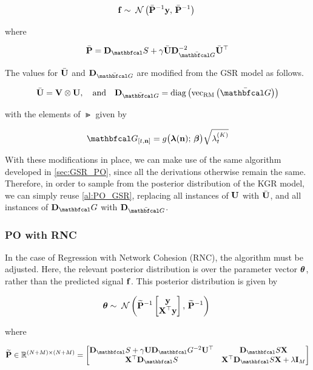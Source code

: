 \begin{equation}
    \mathbf{f} \sim \; \mathcal{N}\left(\bar{\mathbf{P}}^{-1} \mathbf{y}, \, \bar{\mathbf{P}}^{-1}\right) \;
\end{equation}

where 

\begin{equation}
    \bar{\PP} = \D_\St + \gamma \bar{\U} \D_{\bar{\Gt}}^{-2} \bar{\U}^\top
\end{equation}

The values for $\bar{\mathbf{U}}$ and $\D_{\bar{\Gt}}$ are modified from the GSR model as follows. 

\begin{equation}
    \bar{\U} = \V \otimes \U, \aand \D_{\bar{\Gt}} = \diag{\vecrm{\bar{\Gt}}}
\end{equation}

with the elements of $\Gt$ given by 

\begin{equation}
    \Gt_{[t, \nn]} = g\big(\lambdaa(\nn); \, \betaa\big) \sqrt{\lambda^{(K)}_t} 
\end{equation}

With these modifications in place, we can make use of the same algorithm developed in \cref{sec:GSR_PO}, since all the derivations otherwise remain the same. Therefore, in order to sample from the posterior distribution of the KGR model, we can simply reuse \cref{al:PO_GSR}, replacing all instances of $\mathbf{U}$ with $\bar{\mathbf{U}}$, and all instances of $\D_\Gt$ with $\D_{\bar{\Gt}}$. 

\subsubsection{PO with RNC}

\label{sec:PO_RNC}

In the case of Regression with Network Cohesion (RNC), the algorithm must be adjusted. Here, the relevant posterior distribution is over the parameter vector $\boldsymbol{\theta}$, rather than the predicted signal $\mathbf{f}$. This posterior distribution is given by 

\begin{equation}
    \boldsymbol{\theta} \sim \; \mathcal{N}\left(\widetilde{\mathbf{P}}^{-1} \begin{bmatrix} \mathbf{y} \\ \mathbf{X}^\top \mathbf{y} \end{bmatrix}, \, \widetilde{\mathbf{P}}^{-1}\right) \;
\end{equation}

where 

\begin{equation}
    \widetilde{\PP} \in \R^{(N + M) \times (N + M)}= 
    \begin{bmatrix}
     \D_\St + \gamma \U \D_\Gt^{-2} \U^\top & \D_\St  \X \\
     \X^\top \D_\St & \X^\top \D_\St \X + \lambda \I_M   
    \end{bmatrix}
\end{equation}


